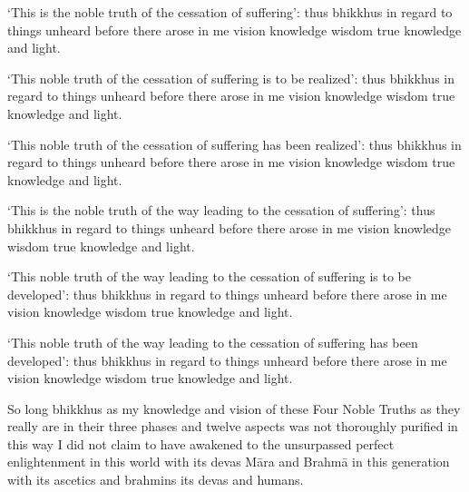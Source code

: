 \medskip

\begin{english-only-hang}
  `This is the noble truth of the cessation of suffering': thus bhikkhus in regard to things unheard before there arose in me vision knowledge wisdom true knowledge and light.
\end{english-only-hang}

\medskip

\begin{english-only-hang}
  `This noble truth of the cessation of suffering is to be realized': thus bhikkhus in regard to things unheard before there arose in me vision knowledge wisdom true knowledge and light.
\end{english-only-hang}

\medskip

\begin{english-only-hang}
  `This noble truth of the cessation of suffering has been realized': thus bhikkhus in regard to things unheard before there arose in me vision knowledge wisdom true knowledge and light.
\end{english-only-hang}

\medskip

\begin{english-only-hang}
  `This is the noble truth of the way leading to the cessation of suffering': thus bhikkhus in regard to things unheard before there arose in me vision knowledge wisdom true knowledge and light.
\end{english-only-hang}

\medskip

\begin{english-only-hang}
  `This noble truth of the way leading to the cessation of suffering is to be developed': thus bhikkhus in regard to things unheard before there arose in me vision knowledge wisdom true knowledge and light.
\end{english-only-hang}

\medskip

\begin{english-only-hang}
  `This noble truth of the way leading to the cessation of suffering has been developed': thus bhikkhus in regard to things unheard before there arose in me vision knowledge wisdom true knowledge and light.
\end{english-only-hang}

\medskip

\begin{english-only-hang}
  So long bhikkhus as my knowledge and vision of these Four Noble Truths as they really are in their three phases and twelve aspects was not thoroughly purified in this way I did not claim to have awakened to the unsurpassed perfect enlightenment in this world with its devas Māra and Brahmā in this generation with its ascetics and brahmins its devas and humans.
\end{english-only-hang}

